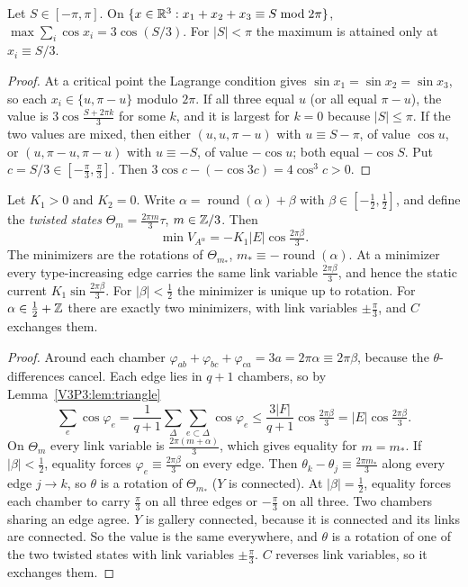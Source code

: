 \begin{lemma}\label{V3P3:lem:triangle}
Let $S\in[-\pi,\pi]$. On $\{x\in\mathbb{R}^{3}:x_1+x_2+x_3\equiv S\bmod2\pi\}$,
$\max\sum_i\cos x_i=3\cos(S/3)$. For $|S|<\pi$ the maximum is attained only at
$x_i\equiv S/3$.
\end{lemma}

\begin{proof}
At a critical point the Lagrange condition gives $\sin x_1=\sin x_2=\sin x_3$, so each
$x_i\in\{u,\pi-u\}$ modulo $2\pi$. If all three equal $u$ (or all equal $\pi-u$), the value is
$3\cos\frac{S+2\pi k}{3}$ for some $k$, and it is largest for $k=0$ because $|S|\le\pi$. If the
two values are mixed, then either $(u,u,\pi-u)$ with $u\equiv S-\pi$, of value $\cos u$, or
$(u,\pi-u,\pi-u)$ with $u\equiv-S$, of value $-\cos u$; both equal $-\cos S$. Put
$c=S/3\in[-\frac\pi3,\frac\pi3]$. Then
$3\cos c-(-\cos3c)=4\cos^{3}c>0$.
\end{proof}

\begin{theorem}\label{V3P3:thm:ground}
Let $K_1>0$ and $K_2=0$. Write $\alpha=\operatorname{round}(\alpha)+\beta$ with
$\beta\in[-\frac12,\frac12]$, and define the \emph{twisted states}
$\Theta_m=\frac{2\pi m}{3}\tau$, $m\in\mathbb{Z}/3$. Then
\[
\min V_{A^{\alpha}}=-K_1|E|\cos\tfrac{2\pi\beta}{3}.
\]
The minimizers are the rotations of $\Theta_{m_*}$, $m_*\equiv-\operatorname{round}(\alpha)$.
At a minimizer every type-increasing edge carries the same link variable $\frac{2\pi\beta}{3}$,
and hence the static current $K_1\sin\frac{2\pi\beta}3$. For $|\beta|<\frac12$ the minimizer
is unique up to rotation. For $\alpha\in\frac12+\mathbb{Z}$ there are exactly two minimizers, with link
variables $\pm\frac\pi3$, and $C$ exchanges them.
\end{theorem}

\begin{proof}
Around each chamber $\varphi_{ab}+\varphi_{bc}+\varphi_{ca}=3a=2\pi\alpha\equiv2\pi\beta$,
because the $\theta$-differences cancel. Each edge lies in $q+1$ chambers, so by
Lemma~\ref{V3P3:lem:triangle}
\[
\sum_e\cos\varphi_e=\frac1{q+1}\sum_{\Delta}\sum_{e\subset\Delta}\cos\varphi_e
\le\frac{3|F|}{q+1}\cos\tfrac{2\pi\beta}3=|E|\cos\tfrac{2\pi\beta}3 .
\]
On $\Theta_m$ every link variable is $\frac{2\pi(m+\alpha)}{3}$, which gives equality for
$m=m_*$. If $|\beta|<\frac12$, equality forces $\varphi_e\equiv\frac{2\pi\beta}3$ on every
edge. Then $\theta_k-\theta_j\equiv\frac{2\pi m_*}{3}$ along every edge $j\to k$, so $\theta$ is
a rotation of $\Theta_{m_*}$ ($Y$ is connected). At $|\beta|=\frac12$, equality forces each
chamber to carry $\frac\pi3$ on all three edges or $-\frac\pi3$ on all three. Two chambers
sharing an edge agree. $Y$ is gallery connected, because it is connected and its links are
connected. So the value is the same everywhere, and $\theta$ is a rotation of one of the two
twisted states with link variables $\pm\frac\pi3$. $C$ reverses link variables, so it exchanges
them.
\end{proof}

